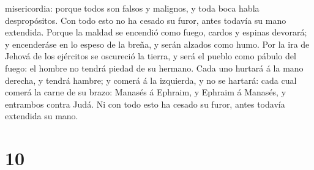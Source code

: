 misericordia: porque todos son falsos y malignos, y toda boca habla
despropósitos. Con todo esto no ha cesado su furor, antes todavía su
mano extendida.  Porque la maldad se encendió como fuego,
cardos y espinas devorará; y encenderáse en lo espeso de la breña, y
serán alzados como humo.  Por la ira de Jehová de los
ejércitos se oscureció la tierra, y será el pueblo como pábulo del
fuego: el hombre no tendrá piedad de su hermano.  Cada uno
hurtará á la mano derecha, y tendrá hambre; y comerá á la izquierda, y
no se hartará: cada cual comerá la carne de su brazo: 
Manasés á Ephraim, y Ephraim á Manasés, y entrambos contra Judá. Ni con
todo esto ha cesado su furor, antes todavía extendida su mano.

\hypertarget{section-9}{%
\section{10}\label{section-9}}

